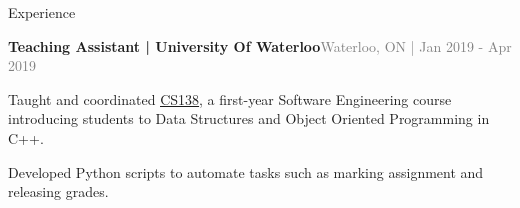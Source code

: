 \documentclass[hidelinks]{resume} %
\begin{document}
\begin{rSection}{Experience}
\begin{rSubsection}{\textbf{Teaching Assistant | University Of Waterloo}}{\textcolor{gray}{\small Waterloo, ON | Jan 2019 - Apr 2019}}{}
    \begin{bulletpoints}
        \vspace{-.10cm}
        \item Taught and coordinated \href{https://student.cs.uwaterloo.ca/~cs138/outline.shtml}{ \underline{CS138}}, a first-year Software Engineering course introducing students to Data Structures and Object Oriented Programming in C++.
        \vspace{-.13cm}
        \item Developed Python scripts to automate tasks such as marking assignment and releasing grades.
        \vspace{-.10cm}
    \end{bulletpoints}   

\end{rSubsection}

\end{rSection}

\vspace{-.05cm}
\end{document}
